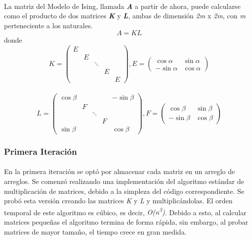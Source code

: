 \documentclass[a4paper,11pt]{article}
\begin{document}
\paragraph{}
La matriz del Modelo de Ising, llamada \textbf{\emph{A}} a partir de ahora,
puede calcularse como el producto de dos matrices \textbf{\emph{K}} y
\textbf{\emph{L}}, ambas de dimensi\'on \emph{2m} x \emph{2m}, con \emph{m}
perteneciente a los naturales.
\begin{equation} \label{matrizA}
A = K L
\end{equation}
donde
\begin{equation} \label{matrizK}
K =
\left( \begin{array}{ccccc}
E &  &  &  & \\
 & E &  &  & \\
 &  & \ddots &  & \\
 &  &  & E & \\
 &  &  &  & E\end{array} \right),	E =
 \left( \begin{array}{cc}
  \cos \alpha & \sin \alpha\\
-\sin \alpha & \cos \alpha\end{array} \right)
\end{equation}
\\
\begin{equation} \label{matrizL}
L =
\left( \begin{array}{ccccc}
\cos \beta &  &  &  & -\sin \beta\\
 & F &  &  & \\
 &  & \ddots &  & \\
 &  &  & F & \\
\sin \beta &  &  &  & \cos \beta\end{array} \right),	F =
 \left( \begin{array}{cc}
  \cos \beta & \sin \beta\\
-\sin \beta & \cos \beta\end{array} \right)
\end{equation}
\subsubsection{Primera Iteraci\'on}
\paragraph{}
En la primera iteraci\'on se opt\'o por almacenar cada matriz en un arreglo de
arreglos. Se comenz\'o realizando una implementaci\'on del algoritmo est\'andar
de multiplicaci\'on de matrices, debido a la simpleza del c\'odigo
correspondiente. Se prob\'o esta versi\'on creando las matrices \emph{K} y
\emph{L} y multiplic\'andolas. El orden temporal de este algoritmo es c\'ubico,
es decir, \emph{O(n\textsuperscript{3})}. Debido a esto, al calcular matrices
pequeñas el algoritmo termina de forma r\'apida, sin embargo, al probar
matrices de mayor tamaño, el tiempo crece en gran medida.
\end{document}
